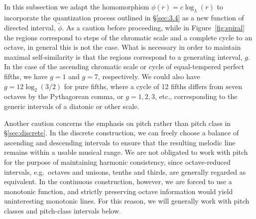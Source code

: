 \documentclass[11pt]{article}
\theoremstyle{plain}
\theoremstyle{definition}
\theoremstyle{remark}
\begin{document}
\subsection{}
\label{sec:3.5}

In this subsection we adapt the homomorphism $\phi(r) = c \log_\lambda(r)$ to incorporate the quantization process outlined in \S\ref{sec:3.4} as a new function of directed interval, $\tilde{\phi}$. As a caution before proceeding, while in Figure~\ref{fig:spiral} the regions correspond to steps of the chromatic scale and a complete cycle to an octave, in general this is not the case. What is necessary in order to maintain maximal self-similarity is that the regions correspond to a generating interval, $g$. In the case of the ascending chromatic scale or cycle of equal-tempered perfect fifths, we have $g = 1$ and $g = 7$, respectively. We could also have $g = 12 \log_2(3/2)$ for pure fifths, where a cycle of 12 fifths differs from seven octaves by the Pythagorean comma, or $g = 1, 2, 3$, etc., corresponding to the generic intervals of a diatonic or other scale.

Another caution concerns the emphasis on pitch rather than pitch class in \S\ref{sec:discrete}. In the discrete construction, we can freely choose a balance of ascending and descending intervals to ensure that the resulting melodic line remains within a usable musical range. We are not obligated to work with pitch for the purpose of maintaining harmonic consistency, since octave-reduced intervals, e.g.\ octaves and unisons, tenths and thirds, are generally regarded as equivalent. In the continuous construction, however, we are forced to use a monotonic function, and strictly preserving octave information would yield uninteresting monotonic lines. For this reason, we will generally work with pitch classes and pitch-class intervals below.
\end{document}
